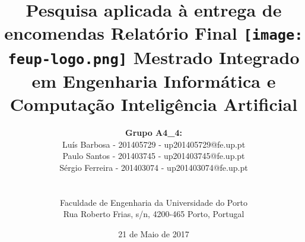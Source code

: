 \documentclass[a4paper]{article}
\begin{document}
\setlength{\textwidth}{16cm}
\setlength{\textheight}{22cm}

\title{\Huge\textbf{Pesquisa aplicada à entrega de encomendas}\linebreak\linebreak\linebreak
\Large\textbf{Relatório Final}\linebreak\linebreak
\linebreak\linebreak
\texttt{[image: feup-logo.png]}\linebreak\linebreak
\linebreak\linebreak
\Large{Mestrado Integrado em Engenharia Informática e Computação} \linebreak\linebreak
\Large{Inteligência Artificial}\linebreak
}

\author{\textbf{Grupo A4\_4:}\\ Luís  Barbosa - 201405729 - up201405729@fe.up.pt\\ Paulo Santos - 201403745 - up201403745@fe.up.pt \\ Sérgio Ferreira - 201403074 - up201403074@fe.up.pt \\\linebreak\linebreak \\
 \\ Faculdade de Engenharia da Universidade do Porto \\ Rua Roberto Frias, s/n, 4200-465 Porto, Portugal \linebreak\linebreak\linebreak
\linebreak\linebreak\vspace{1cm}}
\date{21 de Maio de 2017}
\maketitle
\thispagestyle{empty}


\newpage
\end{document}

